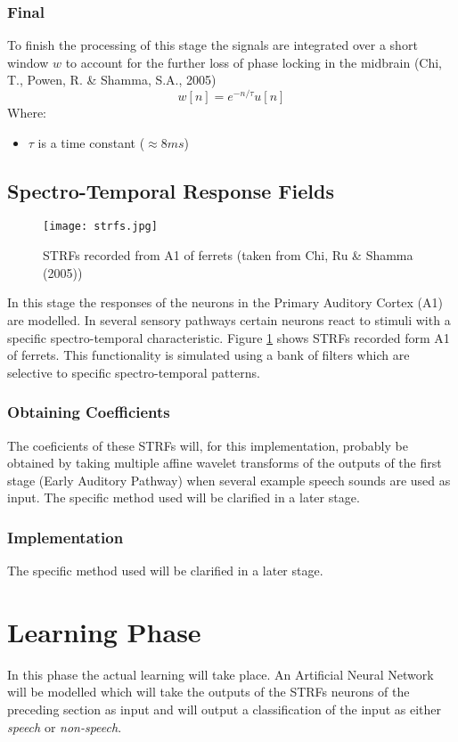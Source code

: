 \documentclass{article}
\begin{document}
\subsubsection{Final}
To finish the processing of this stage the signals are integrated over a short window $w$ to account for the further loss of phase locking in the midbrain (Chi, T., Powen, R. \& Shamma, S.A., 2005)
\begin{equation*}
    w[n] = e^{-n/\tau} u[n]
\end{equation*}
Where:
\begin{itemize}
    \item $\tau$ is a time constant ($\approx 8ms$)
\end{itemize}


\subsection{Spectro-Temporal Response Fields}
\begin{figure}
	\texttt{[image: strfs.jpg]}
	\caption{STRFs recorded from A1 of ferrets (taken from Chi, Ru \& Shamma (2005))}
	\label{fig:strfs}
\end{figure}
In this stage the responses of the neurons in the Primary Auditory Cortex (A1) are modelled. In several sensory pathways certain neurons react to stimuli with a specific spectro-temporal characteristic. Figure \ref{fig:strfs} shows STRFs recorded form A1 of ferrets. This functionality is simulated using a bank of filters which are selective to specific spectro-temporal patterns. 
\subsubsection{Obtaining Coefficients}
The coeficients of these STRFs will, for this implementation, probably be obtained by taking multiple affine wavelet transforms of the outputs of the first stage (Early Auditory Pathway) when several example speech sounds are used as input.
The specific method used will be clarified in a later stage.
\subsubsection{Implementation}
The specific method used will be clarified in a later stage.

\section{Learning Phase}
In this phase the actual learning will take place. An Artificial Neural Network will be modelled which will take the outputs of the STRFs neurons of the preceding section as input and will output a classification of the input as either \emph{speech} or \emph{non-speech}.
\end{document}
